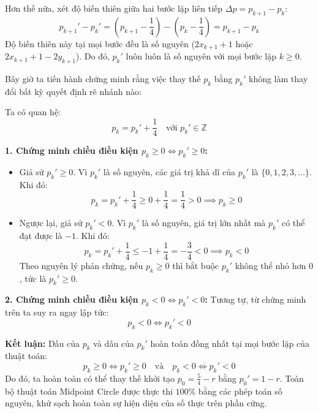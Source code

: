 Hơn thế nữa, xét độ biến thiên giữa hai bước lặp liên tiếp $\Delta p = p_{k+1} - p_k$:
\begin{equation}
p_{k+1}' - p_k' = \left( p_{k+1} - \frac{1}{4} \right) - \left( p_k - \frac{1}{4} \right) = p_{k+1} - p_k
\end{equation}
Độ biến thiên này tại mọi bước đều là số nguyên ($2x_{k+1} + 1$ hoặc $2x_{k+1} + 1 - 2y_{k+1}$). Do đó, $p_k'$ luôn luôn là số nguyên với mọi bước lặp $k \ge 0$.

Bây giờ ta tiến hành chứng minh rằng việc thay thế $p_k$ bằng $p_k'$ không làm thay đổi bất kỳ quyết định rẽ nhánh nào:

Ta có quan hệ:
\begin{equation}
p_k = p_k' + \frac{1}{4} \quad \text{với } p_k' \in \mathbb{Z}
\end{equation}

\textbf{1. Chứng minh chiều điều kiện $p_k \ge 0 \iff p_k' \ge 0$:}
\begin{itemize}
    \item Giả sử $p_k' \ge 0$. Vì $p_k'$ là số nguyên, các giá trị khả dĩ của $p_k'$ là $\{0, 1, 2, 3, \dots\}$. Khi đó:
    \begin{equation}
    p_k = p_k' + \frac{1}{4} \ge 0 + \frac{1}{4} = \frac{1}{4} > 0 \implies p_k \ge 0
    \end{equation}
    \item Ngược lại, giả sử $p_k' < 0$. Vì $p_k'$ là số nguyên, giá trị lớn nhất mà $p_k'$ có thể đạt được là $-1$. Khi đó:
    \begin{equation}
    p_k = p_k' + \frac{1}{4} \le -1 + \frac{1}{4} = -\frac{3}{4} < 0 \implies p_k < 0
    \end{equation}
    Theo nguyên lý phản chứng, nếu $p_k \ge 0$ thì bắt buộc $p_k'$ không thể nhỏ hơn $0$, tức là $p_k' \ge 0$.
\end{itemize}

\textbf{2. Chứng minh chiều điều kiện $p_k < 0 \iff p_k' < 0$:}
Tương tự, từ chứng minh trên ta suy ra ngay lập tức:
\begin{equation}
p_k < 0 \iff p_k' < 0
\end{equation}

\textbf{Kết luận:}
Dấu của $p_k$ và dấu của $p_k'$ hoàn toàn đồng nhất tại mọi bước lặp của thuật toán:
\begin{equation}
p_k \ge 0 \iff p_k' \ge 0 \quad \text{và} \quad p_k < 0 \iff p_k' < 0
\end{equation}
Do đó, ta hoàn toàn có thể thay thế khởi tạo $p_0 = \frac{5}{4} - r$ bằng $p_0' = 1 - r$. Toàn bộ thuật toán Midpoint Circle được thực thi $100\%$ bằng các phép toán số nguyên, khử sạch hoàn toàn sự hiện diện của số thực trên phần cứng.

